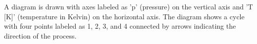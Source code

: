 A diagram is drawn with axes labeled as 'p' (pressure) on the vertical axis and 'T [K]' (temperature in Kelvin) on the horizontal axis. The diagram shows a cycle with four points labeled as 1, 2, 3, and 4 connected by arrows indicating the direction of the process.